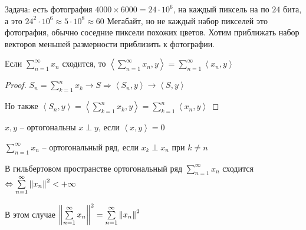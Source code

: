 

\begin{example}\thmslashn
	
	Задача: есть фотография $4000 \times 6000 = 24 \cdot 10^6$, на каждый пиксель на по $24$ бита, а это $24^2 \cdot 10^6 \approx 5 \cdot 10^8 \approx 60$ Мегабайт, но не каждый набор пикселей это фотография, обычно соседние пиксели похожих цветов. Хотим приближать набор векторов меньшей размерности приблизить к фотографии.
	
\end{example}

\begin{lemma}\thmslashn
	
	Если $\sum\limits_{n = 1}^\infty x_n$ сходится, то $\left\langle \sum\limits_{n = 1}^\infty x_n, y \right\rangle = \sum\limits_{n = 1}^\infty \left\langle x_n, y \right\rangle$
	
\end{lemma}

\begin{proof}\thmslashn
	
	$S_n = \sum\limits_{k = 1}^n x_k \to S \Rightarrow \left\langle S_n, y \right\rangle \to \left\langle S, y \right\rangle$

	Но также $\left\langle S_n, y \right\rangle = \left\langle \sum\limits_{k = 1}^n x_k, y \right\rangle = \sum\limits_{k = 1}^n \left\langle x_n, y \right\rangle $
	
\end{proof}

\begin{definition}\thmslashn
	
	$x, y$ -- ортогональны $x\perp y$, если $\left\langle x, y \right\rangle = 0$	
	
\end{definition}

\begin{definition}\thmslashn
	
	$\sum\limits_{n = 1}^\infty x_n$ -- ортогональный ряд, если $x_k\perp x_n$ при $k \not = n$

\end{definition}

\begin{theorem}\thmslashn 
	
	В гильбертовом  пространстве ортогональный ряд $\sum\limits_{n = 1}^\infty x_n$ сходится $\Leftrightarrow \sum\limits_{n = 1}^\infty \left\|x_n\right\|^2 < + \infty$
	
	В этом случае $\left\|\sum\limits_{n = 1}^\infty x_n\right\|^2 = \sum\limits_{n = 1}^\infty \left\|x_n\right\|^2$
	
\end{theorem}

